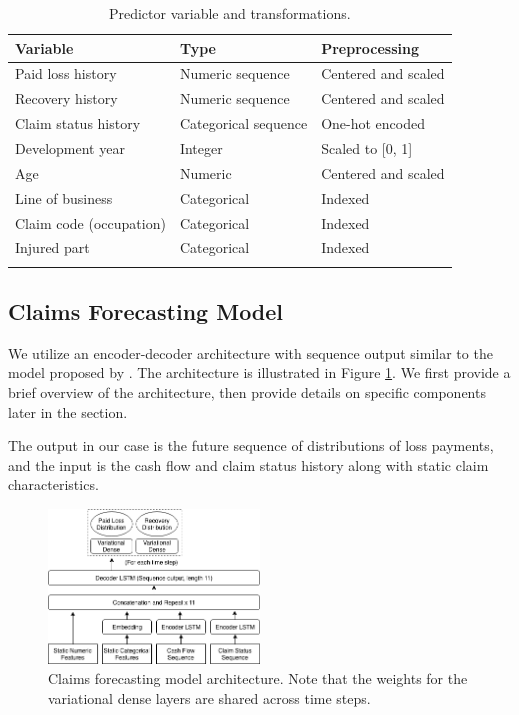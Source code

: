 \documentclass{article}
\begin{document}
\begin{table}[ht]
\centering
\begin{tabular}[t]{lll}
\toprule
Variable & Type & Preprocessing\\
\midrule
Paid loss history      & Numeric sequence         & Centered and scaled\\
Recovery history       & Numeric sequence         & Centered and scaled\\
Claim status history   & Categorical sequence     & One-hot encoded\\
Development year       & Integer                  & Scaled to [0, 1]\\
Age                    & Numeric                  & Centered and scaled\\
Line of business       & Categorical              & Indexed\\
Claim code (occupation)& Categorical              & Indexed\\
Injured part           & Categorical              & Indexed\\
\bottomrule\\[1ex]
\end{tabular}
\caption{Predictor variable and transformations.}
\label{table:vars}
\end{table}%

\subsection{Claims Forecasting Model}\label{sec:claims-forecasting-model}

We utilize an encoder-decoder architecture with sequence output similar to the model proposed by \cite{kuo2018deeptriangle}. The architecture is illustrated in Figure \ref{fig:architecture}. We first provide a brief overview of the architecture, then provide details on specific components later in the section.

The output in our case is the future sequence of distributions of loss payments, and the input is the cash flow and claim status history along with static claim characteristics.

\begin{figure}
  \begin{center}
    \includegraphics[width=0.5\textwidth]{images/architecture.png}
  \end{center}
  \caption{Claims forecasting model architecture. Note that the weights for the variational dense layers are shared across time steps.}
  \label{fig:architecture}
\end{figure}
\end{document}
